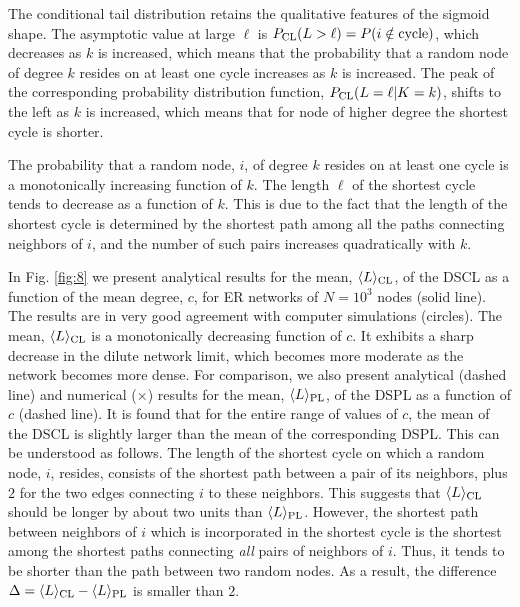 \documentclass[preprint,pre,superscriptaddress,showpacs]{revtex4}
\begin{document}
The conditional tail distribution retains the qualitative features of the
sigmoid shape. 
The asymptotic value at large $\ell$ is
$P_{\rm CL}(L>\ell)=P(i \notin {\rm cycle})$, which decreases as $k$ is 
increased, which means that the probability that a random node
of degree $k$ resides on at least one cycle increases as $k$ is
increased. 
The peak of the corresponding probability distribution function,
$P_{\rm CL}(L=\ell | K=k)$,
shifts to the left as $k$ is increased,
which means that for node of higher degree the shortest cycle
is shorter.


The probability that a random node, $i$, of degree $k$ resides on at least one cycle
is a monotonically increasing function of $k$.
The length $\ell$ of the shortest cycle tends to decrease as a function
of $k$. This is due to the fact that the length of the shortest cycle
is determined by the shortest path among all the paths connecting
neighbors of $i$, and the number of such pairs increases quadratically with $k$. 

In Fig. \ref{fig:8} we present
analytical results for the
mean, $\langle L \rangle_{\rm CL}$, of the DSCL 
as a function of the mean degree, $c$, for ER networks 
of $N=10^3$ nodes (solid line).
The results are in very good agreement with
computer simulations (circles).
The mean, $\langle L \rangle_{\rm CL}$ is a monotonically
decreasing function of $c$. 
It exhibits a sharp decrease in the dilute network limit,
which becomes more moderate as the network becomes
more dense.
For comparison, we also present 
analytical (dashed line) and numerical ($\times$) results for
the mean, 
$\langle L \rangle_{\rm PL}$,
of the DSPL as a function of $c$
(dashed line).
It is found that for the entire range of values of $c$, the
mean of the DSCL is slightly larger than the mean of the
corresponding DSPL.
This can be understood as follows. 
The length of the shortest cycle on which a random node, $i$, resides, 
consists of the shortest path between a pair of its neighbors, plus $2$ 
for the two edges connecting $i$ to these neighbors. 
This suggests that $\langle L \rangle_{\rm CL}$ should be longer
by about two units than $\langle L \rangle_{\rm PL}$.
However, the shortest path between neighbors of $i$ which is
incorporated in the shortest cycle is the shortest among the 
shortest paths connecting {\it all} pairs of neighbors of $i$. Thus,
it tends to be shorter than the path between two random nodes.
As a result, the difference
$\Delta = \langle L \rangle_{\rm CL} - \langle L \rangle_{\rm PL}$
is smaller than $2$.
\end{document}
